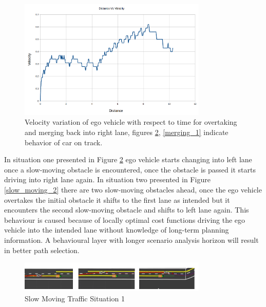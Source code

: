 \begin{figure}
	\centering
	\includegraphics[width=0.8\textwidth]{Images/evaluation/overtaking_dist_vel.png}
	\caption{Velocity variation of ego vehicle with respect to time for overtaking and merging back into right lane, figures \ref{slow_moving_1}, \ref{merging_1} indicate behavior of car on track.}
	\label{time_vel}
\end{figure}



\iffalse 

In situation one presented in Figure \ref{slow_moving_1} ego vehicle starts changing into left lane once a slow-moving obstacle is encountered, once the obstacle is passed it starts driving into right lane again. In situation two presented in Figure \ref{slow_moving_2} there are two slow-moving obstacles ahead, once the ego vehicle overtakes the initial obstacle it shifts to the first lane as intended but it encounters the second slow-moving obstacle and shifts to left lane again. This behaviour is caused because of locally optimal cost functions driving the ego vehicle into the intended lane without knowledge of long-term planning information. A behavioural layer with longer scenario analysis horizon will result in better path selection.


\begin{figure}[h]
    \centering
    \includegraphics[width=0.8\textwidth]{Images/evaluation/slow_moving1.jpg}
    \caption{Slow Moving Traffic Situation 1}
    \label{slow_moving_1}
\end{figure}

